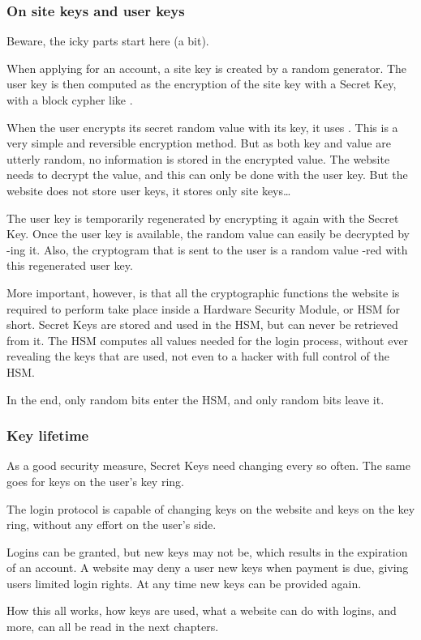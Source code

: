 \subsubsection{On site keys and user keys}
Beware, the icky parts start here (a bit).
\par
When applying for an account, a site key is created by a random generator.
The user key is then computed as the encryption of the site key with a Secret Key, with a block cypher like \AES.
\par
When the user encrypts its secret random value with its key,
it uses \XOR.
This is a very simple and reversible encryption method.
But as both key and value are utterly random, no information is stored in the encrypted value.
The website needs to decrypt the value, and this can only be done with the user key.
But the website does not store user keys,
it stores only site keys\ldots
\par
The user key is temporarily regenerated by encrypting it again with the Secret Key.
Once the user key is available, the random value can easily be decrypted by \XOR-ing it.
Also, the cryptogram that is sent to the user is a random value \XOR-red with this regenerated user key.
\par
More important,
however,
is that all the cryptographic functions the website is required to perform take place inside a Hardware Security Module,
or HSM for short.
Secret Keys are stored and used in the HSM,
but can never be retrieved from it.
The HSM computes all values needed for the login process,
without ever revealing the keys that are used,
not even to a hacker with full control of the HSM.
\par
In the end,
only random bits enter the HSM,
and only random bits leave it.

\subsubsection{Key lifetime}
As a good security measure, Secret Keys need changing every so often.
The same goes for keys on the user's key ring.
\par
The login protocol is capable of changing keys on the website and keys on the key ring,
without any effort on the user's side.
\par
Logins can be granted,
but new keys may not be,
which results in the expiration of an account.
A website may deny a user new keys when payment is due,
giving users limited login rights.
At any time new keys can be provided again.
\par\vspace{10mm}\noindent
How this all works,
how keys are used,
what a website can do with logins,
and more,
can all be read in the next chapters.
